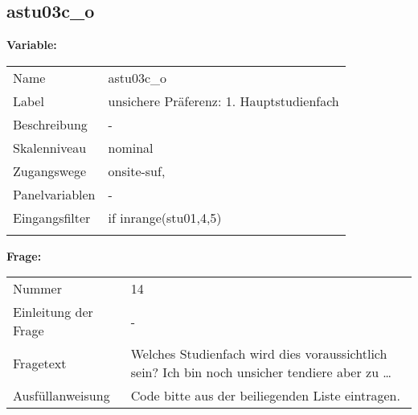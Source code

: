	
	
	\subsection{astu03c\_o}
	\label{subSection:astu03c_o}

	\noindent\textbf{Variable:}\\
		\begin{tabular}{lL{11.3cm}}
			\label{tableVariable:astu03c_o}
			Name & astu03c\_o \\
			Label & unsichere Präferenz: 1. Hauptstudienfach  \\
			Beschreibung & - \\
			Skalenniveau & nominal \\
			Zugangswege &
				onsite-suf,
 \\
			Panelvariablen & -
			 \\
			Eingangsfilter & if inrange(stu01,4,5) \\
 \\
		\end{tabular}

		\vspace*{1 cm}
		\noindent\textbf{Frage:}\\
		\begin{tabular}{lL{11.3cm}}
			\label{tableQuestion:astu03c_o}
			Nummer & 14 \\
			Einleitung der Frage & - \\
			Fragetext & Welches Studienfach wird dies voraussichtlich sein?
Ich bin noch unsicher tendiere aber zu … \\
			Ausfüllanweisung & Code bitte aus der beiliegenden Liste eintragen. \\
		\end{tabular}





